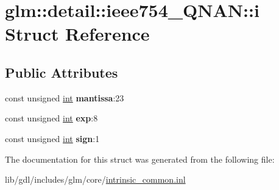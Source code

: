 \hypertarget{structglm_1_1detail_1_1ieee754___q_n_a_n_1_1i}{}\section{glm\+:\+:detail\+:\+:ieee754\+\_\+\+Q\+N\+A\+N\+:\+:i Struct Reference}
\label{structglm_1_1detail_1_1ieee754___q_n_a_n_1_1i}
\subsection*{Public Attributes}
\begin{DoxyCompactItemize}
\item 
\hypertarget{structglm_1_1detail_1_1ieee754___q_n_a_n_1_1i_a1999926defcba631a716bee7d3044d0a}{}const unsigned \hyperlink{_s_d_l__thread_8h_a6a64f9be4433e4de6e2f2f548cf3c08e}{int} {\bfseries mantissa}\+:23\label{structglm_1_1detail_1_1ieee754___q_n_a_n_1_1i_a1999926defcba631a716bee7d3044d0a}

\item 
\hypertarget{structglm_1_1detail_1_1ieee754___q_n_a_n_1_1i_abc8cdb38ff3aa6a09214f7bfa32efac8}{}const unsigned \hyperlink{_s_d_l__thread_8h_a6a64f9be4433e4de6e2f2f548cf3c08e}{int} {\bfseries exp}\+:8\label{structglm_1_1detail_1_1ieee754___q_n_a_n_1_1i_abc8cdb38ff3aa6a09214f7bfa32efac8}

\item 
\hypertarget{structglm_1_1detail_1_1ieee754___q_n_a_n_1_1i_a5dd7e174864b6a8cd045563dde44f305}{}const unsigned \hyperlink{_s_d_l__thread_8h_a6a64f9be4433e4de6e2f2f548cf3c08e}{int} {\bfseries sign}\+:1\label{structglm_1_1detail_1_1ieee754___q_n_a_n_1_1i_a5dd7e174864b6a8cd045563dde44f305}

\end{DoxyCompactItemize}


The documentation for this struct was generated from the following file\+:\begin{DoxyCompactItemize}
\item 
lib/gdl/includes/glm/core/\hyperlink{intrinsic__common_8inl}{intrinsic\+\_\+common.\+inl}\end{DoxyCompactItemize}
